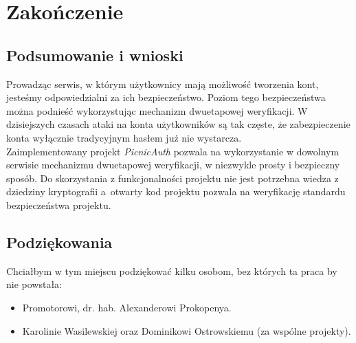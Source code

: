 \chapter{Zakończenie}

\section{Podsumowanie i wnioski}
Prowadząc serwis, w którym użytkownicy mają możliwość tworzenia kont, jesteśmy odpowiedzialni za ich bezpieczeństwo. 
Poziom tego bezpieczeństwa można podnieść wykorzystując mechanizm dwuetapowej weryfikacji. 
W dzisiejszych czasach ataki na konta użytkowników są tak częste, że zabezpieczenie konta wyłącznie tradycyjnym hasłem już nie wystarcza. \\
Zaimplementowany projekt \textit{PicnicAuth} pozwala na wykorzystanie w dowolnym serwisie mechanizmu dwuetapowej weryfikacji, 
w niezwykle prosty i bezpieczny sposób. 
Do skorzystania z funkcjonalności projektu nie jest potrzebna wiedza z dziedziny kryptografii 
a~otwarty kod projektu pozwala na weryfikację standardu bezpieczeństwa projektu.

\section{Podziękowania}
Chciałbym w tym miejscu podziękować kilku osobom, bez których ta praca by nie powstała:
\begin{itemize}
	\item Promotorowi, dr. hab. Alexanderowi Prokopenya.
	\item Karolinie Wasilewskiej oraz Dominikowi Ostrowskiemu (za wspólne projekty).
\end{itemize} 